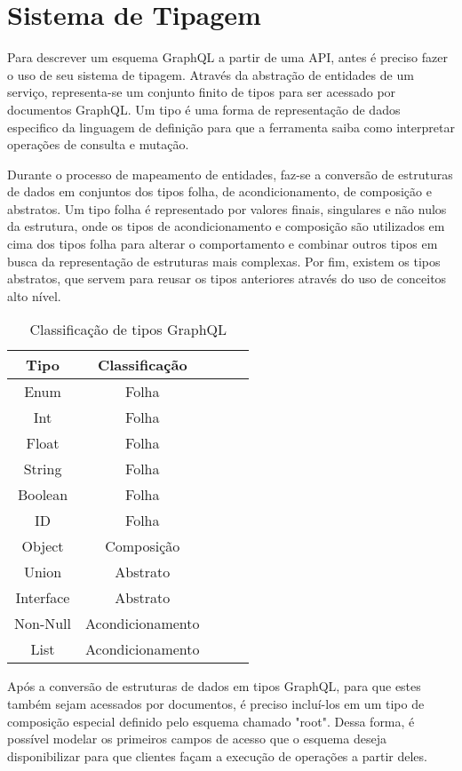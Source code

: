 \section[Sistema de Tipagem]{Sistema de Tipagem}

Para descrever um esquema GraphQL a partir de uma API, antes é preciso fazer o uso de seu sistema de tipagem. Através da abstração de entidades de um serviço, representa-se um conjunto finito de tipos para ser acessado por documentos GraphQL. Um tipo é uma forma de representação de dados especifico da linguagem de definição para que a ferramenta saiba como interpretar operações de consulta e mutação.

Durante o processo de mapeamento de entidades, faz-se a conversão de estruturas de dados em conjuntos dos tipos folha, de acondicionamento, de composição e abstratos. Um tipo folha é representado por valores finais, singulares e não nulos da estrutura, onde os tipos de acondicionamento e composição são utilizados em cima dos tipos folha para alterar o comportamento e combinar outros tipos em busca da representação de estruturas mais complexas. Por fim, existem os tipos abstratos, que servem para reusar os tipos anteriores através do uso de conceitos alto nível.

\begin{table}[H]
  \centering
  \begin{tabular}{|c|c|c|c|c|}
    \hline
    Tipo & Classificação \\
    \hline
    Enum & Folha \\
    \hline
    Int & Folha \\
    \hline
    Float & Folha \\
    \hline
    String & Folha \\
    \hline
    Boolean & Folha \\
    \hline
    ID & Folha \\
    \hline
    Object & Composição \\
    \hline
    Union & Abstrato \\
    \hline
    Interface & Abstrato \\
    \hline
    Non-Null & Acondicionamento \\
    \hline
  	List & Acondicionamento \\
    \hline
  \end{tabular}
  \caption{Classificação de tipos GraphQL}
\end{table}

Após a conversão de estruturas de dados em tipos GraphQL, para que estes também sejam acessados por documentos, é preciso incluí-los em um tipo de composição especial definido pelo esquema chamado "root". Dessa forma, é possível modelar os primeiros campos de acesso que o esquema deseja disponibilizar para que clientes façam a execução de operações a partir deles.

